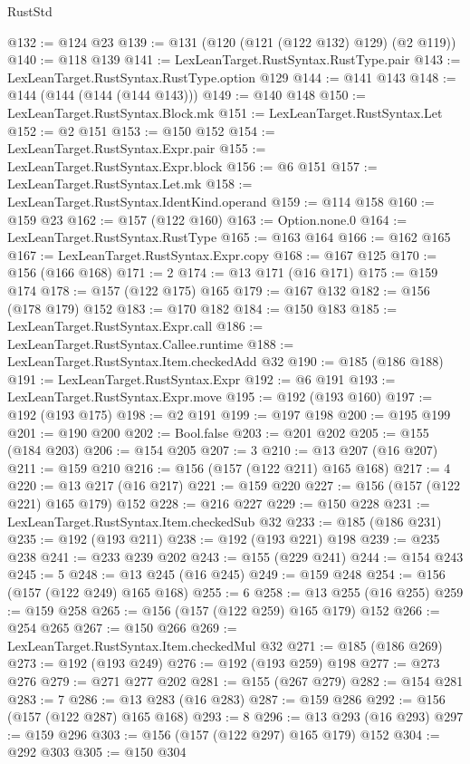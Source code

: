 \begin{lexlean}{RustStd}
\begin{coremodule}
@132 := @124 @23
@139 := @131 (@120 (@121 (@122 @132) @129) (@2 @119))
@140 := @118 @139
@141 := LexLeanTarget.RustSyntax.RustType.pair
@143 := LexLeanTarget.RustSyntax.RustType.option @129
@144 := @141 @143
@148 := @144 (@144 (@144 (@144 @143)))
@149 := @140 @148
@150 := LexLeanTarget.RustSyntax.Block.mk
@151 := LexLeanTarget.RustSyntax.Let
@152 := @2 @151
@153 := @150 @152
@154 := LexLeanTarget.RustSyntax.Expr.pair
@155 := LexLeanTarget.RustSyntax.Expr.block
@156 := @6 @151
@157 := LexLeanTarget.RustSyntax.Let.mk
@158 := LexLeanTarget.RustSyntax.IdentKind.operand
@159 := @114 @158
@160 := @159 @23
@162 := @157 (@122 @160)
@163 := Option.none.{0}
@164 := LexLeanTarget.RustSyntax.RustType
@165 := @163 @164
@166 := @162 @165
@167 := LexLeanTarget.RustSyntax.Expr.copy
@168 := @167 @125
@170 := @156 (@166 @168)
@171 := 2
@174 := @13 @171 (@16 @171)
@175 := @159 @174
@178 := @157 (@122 @175) @165
@179 := @167 @132
@182 := @156 (@178 @179) @152
@183 := @170 @182
@184 := @150 @183
@185 := LexLeanTarget.RustSyntax.Expr.call
@186 := LexLeanTarget.RustSyntax.Callee.runtime
@188 := LexLeanTarget.RustSyntax.Item.checkedAdd @32
@190 := @185 (@186 @188)
@191 := LexLeanTarget.RustSyntax.Expr
@192 := @6 @191
@193 := LexLeanTarget.RustSyntax.Expr.move
@195 := @192 (@193 @160)
@197 := @192 (@193 @175)
@198 := @2 @191
@199 := @197 @198
@200 := @195 @199
@201 := @190 @200
@202 := Bool.false
@203 := @201 @202
@205 := @155 (@184 @203)
@206 := @154 @205
@207 := 3
@210 := @13 @207 (@16 @207)
@211 := @159 @210
@216 := @156 (@157 (@122 @211) @165 @168)
@217 := 4
@220 := @13 @217 (@16 @217)
@221 := @159 @220
@227 := @156 (@157 (@122 @221) @165 @179) @152
@228 := @216 @227
@229 := @150 @228
@231 := LexLeanTarget.RustSyntax.Item.checkedSub @32
@233 := @185 (@186 @231)
@235 := @192 (@193 @211)
@238 := @192 (@193 @221) @198
@239 := @235 @238
@241 := @233 @239 @202
@243 := @155 (@229 @241)
@244 := @154 @243
@245 := 5
@248 := @13 @245 (@16 @245)
@249 := @159 @248
@254 := @156 (@157 (@122 @249) @165 @168)
@255 := 6
@258 := @13 @255 (@16 @255)
@259 := @159 @258
@265 := @156 (@157 (@122 @259) @165 @179) @152
@266 := @254 @265
@267 := @150 @266
@269 := LexLeanTarget.RustSyntax.Item.checkedMul @32
@271 := @185 (@186 @269)
@273 := @192 (@193 @249)
@276 := @192 (@193 @259) @198
@277 := @273 @276
@279 := @271 @277 @202
@281 := @155 (@267 @279)
@282 := @154 @281
@283 := 7
@286 := @13 @283 (@16 @283)
@287 := @159 @286
@292 := @156 (@157 (@122 @287) @165 @168)
@293 := 8
@296 := @13 @293 (@16 @293)
@297 := @159 @296
@303 := @156 (@157 (@122 @297) @165 @179) @152
@304 := @292 @303
@305 := @150 @304

\end{coremodule}
\end{lexlean}
